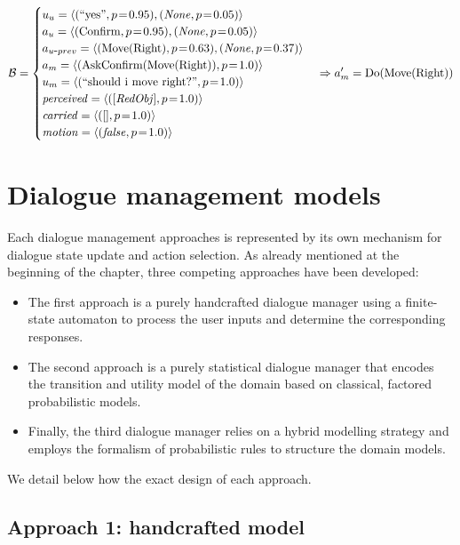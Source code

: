 \begin{align*}
\mathcal{B} = \begin{cases} u_u = \langle (``\text{yes}", p\!=\!0.95), (\mathit{None}, p\!=\!0.05) \rangle \\
a_u = \langle (\mathrm{Confirm}, p\!=\!0.95), (\mathit{None}, p\!=\!0.05) \rangle \\
a_{u\mbox{-}prev} = \langle (\mathrm{Move(Right)}, p\!=\!0.63), (\mathit{None}, p\!=\!0.37) \rangle \\
a_m = \langle (\mathrm{AskConfirm(Move(Right))}, p\!=\!1.0) \rangle \\
u_m = \langle (``\text{should i move right?}", p\!=\!1.0) \rangle \\
\mathit{perceived} = \langle ([\mathit{RedObj}], p\!=\!1.0) \rangle \\
\mathit{carried} = \langle ([], p\!=\!1.0) \rangle \\
\mathit{motion} = \langle (\mathit{false}, p\!=\!1.0) \rangle \\
 \end{cases} \Rightarrow a_m' = \mathrm{Do(Move(Right))}
\end{align*}


\section{Dialogue management models}
\label{sec:dialmodels_exp3}

Each dialogue management approaches is represented by its own mechanism for dialogue state update and action selection.  As already mentioned at the beginning of the chapter, three competing approaches have been developed:
\begin{itemize} 
\item The first approach is a purely handcrafted dialogue manager using a finite-state automaton to process the user inputs and determine the corresponding responses. 
\item The second approach is a purely statistical dialogue manager that encodes the transition and utility model of the domain based on classical, factored probabilistic models.
\item Finally, the third dialogue manager relies on a hybrid modelling strategy and employs the formalism of probabilistic rules to structure the domain models.
\end{itemize}

We detail below how the exact design of each approach.

\subsection{Approach 1: handcrafted model}

